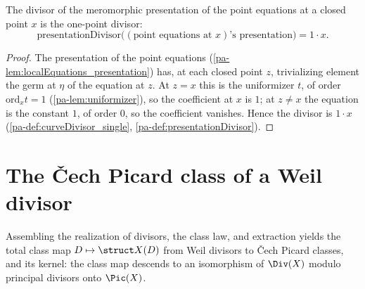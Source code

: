 \begin{theorem}
  \label{pa-thm:presentationDivisor_pointEquations}
  \leanok

  The divisor of the meromorphic presentation of the point equations at a closed point \(x\) is
  the one-point divisor:
  \[
    \mathrm{presentationDivisor}\bigl((\text{point equations at } x)\text{'s presentation}\bigr) =
      1 \cdot x .
  \]
\end{theorem}
\begin{proof}
  \leanok
  The presentation of the point equations (\ref{pa-lem:localEquations_presentation}) has, at each
  closed point \(z\), trivializing element the germ at \(\eta\) of the equation at \(z\). At \(z =
  x\) this is the uniformizer \(t\), of order \(\mathrm{ord}_x t = 1\) (\ref{pa-lem:uniformizer}), so
  the coefficient at \(x\) is \(1\); at \(z \neq x\) the equation is the constant \(1\), of order
  \(0\), so the coefficient vanishes. Hence the divisor is \(1 \cdot x\)
  (\ref{pa-def:curveDivisor_single}, \ref{pa-def:presentationDivisor}).
\end{proof}

\section{The \v Cech Picard class of a Weil divisor}

Assembling the realization of divisors, the class law, and extraction yields the total class map
\(D \mapsto \struct X(D)\) from Weil divisors to \v Cech Picard classes, and its kernel: the class
map descends to an isomorphism of \(\Div(X)\) modulo principal divisors onto \(\Pic(X)\).

